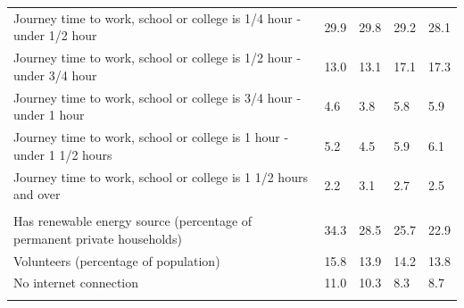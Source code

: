 \documentclass{article}
\begin{document}
\begin{table}[h]
\begin{tabular}{KTTTT}
Journey time to work, school or college is 1/4 hour - under 1/2 hour & 29.9& 29.8& 29.2& 28.1\\
Journey time to work, school or college is 1/2 hour - under 3/4 hour & 13.0& 13.1& 17.1& 17.3\\
Journey time to work, school or college is 3/4 hour - under 1 hour & 4.6& 3.8& 5.8& 5.9\\
Journey time to work, school or college is 1 hour - under 1 1/2 hours & 5.2& 4.5& 5.9& 6.1\\
Journey time to work, school or college is 1 1/2 hours and over & 2.2& 3.1& 2.7& 2.5\\
\hline
    \\ 
    \hline
Has renewable energy source (percentage of permanent private households) & 34.3& 28.5& 25.7& 22.9\\
    \hline
Volunteers (percentage of population) & 15.8& 13.9& 14.2& 13.8\\
    \hline
No internet connection& 11.0& 10.3&  8.3&  8.7\\
\hline
\end{tabular}
\end{table}
\end{document}
